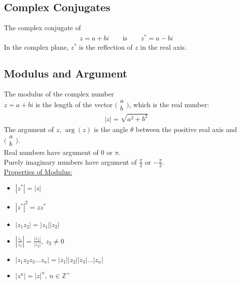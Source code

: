 \documentclass[10pt, a4paper, titlepage]{article}
\begin{document}
\begin{multicols*}{3}
	\subsection{Complex Conjugates}
	The complex conjugate of
	\begin{align}
		z=a+bi\qquad \text{is}\qquad z^*=a-bi
	\end{align}
	In the complex plane, $z^*$ is the  reflection of $z$ in the real axis.

	\dotfill
	\subsection{Modulus and Argument}
	The modulus of the complex number \\$z=a+bi$ is the length of the vector $\big(\begin{smallmatrix}a\\ b\end{smallmatrix}\big)$, which is the real number:
	\begin{align}
		|z|=\sqrt{a^2+b^2}
	\end{align}
	The argument of $z$, $\arg({z})$ is the angle $\theta$ between the positive real axis and $\big(\begin{smallmatrix}a\\ b\end{smallmatrix}\big)$.\\
	Real numbers have argument of 0 or $\pi$.\\
	Purely imaginary numbers have argument of $\frac{\pi}{2}$ or $-\frac{\pi}{2}$.\\

	\underline{Properties of Modulus:}
	\begin{itemize}
		\item $|z^*|=|z|$
		\item $|z^*|^2=zz^*$
		\item $|z_1z_2|=|z_1||z_2|$
		\item $\left|\frac{z_1}{z_2}\right|=\frac{|z_1|}{|z_2|},\ z_2\neq 0$
		\item $|z_1z_2z_3\dots z_n|=|z_1||z_2||z_3|\dots |z_n|$
		\item $|z^n|=|z|^n,\ n\in \mathbb{Z}^+$
	\end{itemize}

	\dotfill

\end{multicols*}
\end{document}
